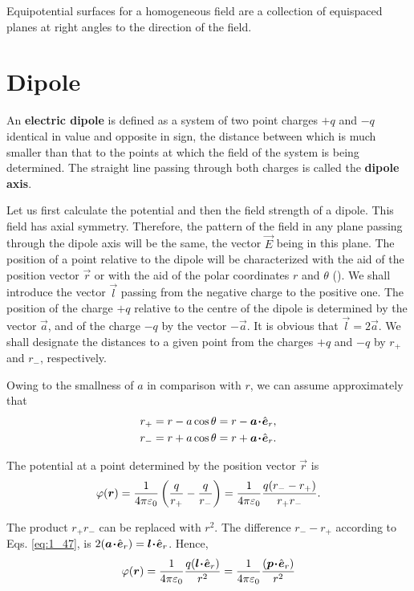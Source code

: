 Equipotential surfaces for a homogeneous field are a collection of equispaced planes at right angles to the direction of the field.

\section{Dipole}\label{sec:1_9}

An \textbf{electric dipole} is defined as a system of two point charges $+q$ and $-q$ identical in value and opposite in sign, the distance between which is much smaller than that to the points at which the field of the system is being determined. The straight line passing through both charges is called the \textbf{dipole axis}.

Let us first calculate the potential and then the field strength of a dipole. This field has axial symmetry. Therefore, the pattern of the field in any plane passing through the dipole axis will be the same, the vector $\vec{E}$ being in this plane. The position of a point relative to the dipole will be characterized with the aid of the position vector $\vec{r}$ or with the aid of the polar coordinates $r$ and $\theta$ (). We shall introduce the vector $\vec{l}$ passing from the negative charge to the positive one. The position of the charge $+q$ relative to the centre of the dipole is determined by the vector $\vec{a}$, and of the charge $-q$ by the vector $-\vec{a}$. It is obvious that $\vec{l}=2\vec{a}$. We shall designate the distances to a given point from the charges $+q$ and $-q$ by $r_+$ and $r_-$, respectively.

Owing to the smallness of $a$ in comparison with $r$, we can assume approximately that
\begin{equation}\label{eq:1_47}
\begin{split}
	r_+ &= r - a\cos\theta = r - \boldsymbol{a}\!\boldsymbol{\cdot}\!\hat{\boldsymbol{e}}_{r},\\
	r_- &= r + a\cos\theta = r + \boldsymbol{a}\!\boldsymbol{\cdot}\!\hat{\boldsymbol{e}}_{r}.
\end{split}
\end{equation}

The potential at a point determined by the position vector $\vec{r}$ is
\begin{equation*}
	\varphi(\boldsymbol{r}) = \frac{1}{4\pi\varepsilon_0} \left(
	\frac{q}{r_+} - \frac{q}{r_-}
	\right) = \frac{1}{4\pi\varepsilon_0} \frac{q(r_- - r_+)}{r_+ r_-}.
\end{equation*}

\noindent
The product $r_+r_-$ can be replaced with $r^2$. The difference $r_--r_+$ according to Eqs. \eqref{eq:1_47}, is $2(\boldsymbol{a}\!\boldsymbol{\cdot}\!\hat{\boldsymbol{e}}_{r})=\boldsymbol{l}\!\boldsymbol{\cdot}\!\hat{\boldsymbol{e}}_{r}$. Hence,
\begin{equation}\label{eq:1_48}
	\varphi(\boldsymbol{r}) = \frac{1}{4\pi\varepsilon_0} \frac{q(\boldsymbol{l}\!\boldsymbol{\cdot}\!\hat{\boldsymbol{e}}_{r})}{r^2} = \frac{1}{4\pi\varepsilon_0} \frac{(\boldsymbol{p}\!\boldsymbol{\cdot}\!\hat{\boldsymbol{e}}_{r})}{r^2}
\end{equation}

